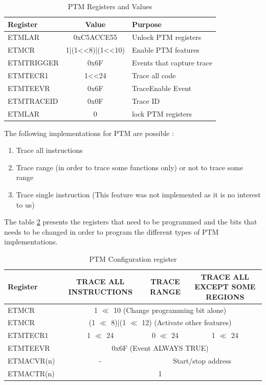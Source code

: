\documentclass[10pt,a4paper, oneside]{memoir}
\begin{document}
\begin{table}[]
	\centering
	\begin{tabular}{lcl}
	\toprule
	\textbf{Register} & \textbf{Value} & \textbf{Purpose} \\
	\midrule
	ETMLAR 	  & 	0xC5ACCE55  & 	Unlock PTM registers	\\ 
	ETMCR 	  &	1|(1<<8)|(1<<10)&	Enable PTM features	\\
	ETMTRIGGER&	0x6F			&	Events that capture trace	\\
	ETMTECR1	&	1<<24		& 	Trace all code	 	\\	
	ETMTEEVR	&	0x6F 		&	TraceEnable Event 		\\
	ETMTRACEID	&	0x0F 		& 	Trace ID 			\\
	ETMLAR 		& 	0  			& 	lock PTM registers		\\ 	
	\bottomrule
	\end{tabular}
	\caption{PTM Registers and Values}
	\label{tab:ptm_registers}
\end{table}

The following implementations for PTM are possible : 
\begin{enumerate}
\item Trace all instructions 
\item Trace range (in order to trace some functions only) or not to trace some range 
\item Trace single instruction (This feature was not implemented as it is no interest to us)
\end{enumerate}

The table \ref{tab:ptm_configuration_registers} presents the registers that need to be programmed and the bits that needs to be changed in order to program the different types of PTM implementations.

\begin{table}[]
  \centering
\begin{adjustbox}{max width=\textwidth}
\begin{tabular}{l|ccc}
\toprule
\textbf{Register} & \textbf{TRACE ALL INSTRUCTIONS} & \textbf{TRACE RANGE} & \textbf{TRACE ALL EXCEPT SOME REGIONS}\\
\midrule
ETMCR & \multicolumn{3}{c}{1 $\ll$ 10 (Change programming bit alone)} \\ 
ETMCR &  \multicolumn{3}{c}{(1 $\ll$ 8)|(1 $\ll$ 12) (Activate other features)}\\
ETMTECR1 & 1 $\ll$ 24 & 0 $\ll$ 24 & 1 $\ll$ 24 \\
ETMTEEVR & \multicolumn{3}{c}{ 0x6F (Event ALWAYS TRUE)}\\
ETMACVR(n) &  - & \multicolumn{2}{c}{Start/stop address} \\
ETMACTR(n) & \multicolumn{3}{c}{1}\\
\bottomrule
\end{tabular}
\end{adjustbox}
  \caption{PTM Configuration register}
  \label{tab:ptm_configuration_registers}
\end{table}
\end{document}
